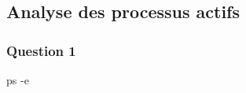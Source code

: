 \documentclass[]{article}
\newenvironment{Shaded}{}{}
\newcommand{\FunctionTok}[1]{\textcolor[rgb]{0.02,0.16,0.49}{#1}}
\newcommand{\NormalTok}[1]{#1}
\begin{document}
\hypertarget{analyse-des-processus-actifs}{%
\subsection{Analyse des processus
actifs}\label{analyse-des-processus-actifs}}

\hypertarget{question-1-2}{%
\subsubsection{Question 1}\label{question-1-2}}

\begin{Shaded}
\begin{Highlighting}[]
\FunctionTok{ps}\NormalTok{ -e}
\end{Highlighting}
\end{Shaded}
\end{document}
